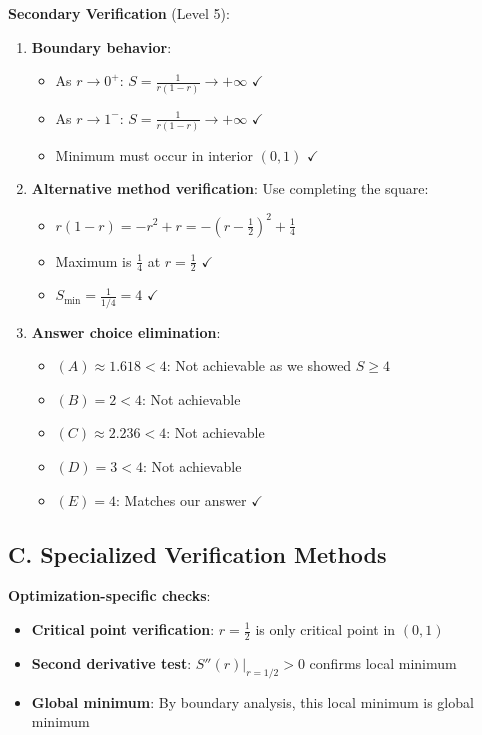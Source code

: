 \documentclass[12pt]{article}
\begin{document}
\begin{verificationbox}
\textbf{Secondary Verification} (Level 5):
\begin{enumerate}[leftmargin=*]
    \item \textbf{Boundary behavior}: 
    \begin{itemize}
        \item As $r \to 0^+$: $S = \frac{1}{r(1-r)} \to +\infty$ $\checkmark$
        \item As $r \to 1^-$: $S = \frac{1}{r(1-r)} \to +\infty$ $\checkmark$
        \item Minimum must occur in interior $(0,1)$ $\checkmark$
    \end{itemize}
    \item \textbf{Alternative method verification}: Use completing the square:
    \begin{itemize}
        \item $r(1-r) = -r^2 + r = -(r - \frac{1}{2})^2 + \frac{1}{4}$
        \item Maximum is $\frac{1}{4}$ at $r = \frac{1}{2}$ $\checkmark$
        \item $S_{\min} = \frac{1}{1/4} = 4$ $\checkmark$
    \end{itemize}
    \item \textbf{Answer choice elimination}:
    \begin{itemize}
        \item $(A) \approx 1.618 < 4$: Not achievable as we showed $S \geq 4$
        \item $(B) = 2 < 4$: Not achievable
        \item $(C) \approx 2.236 < 4$: Not achievable
        \item $(D) = 3 < 4$: Not achievable
        \item $(E) = 4$: Matches our answer $\checkmark$
    \end{itemize}
\end{enumerate}

\subsection*{C. Specialized Verification Methods}

\textbf{Optimization-specific checks}:
\begin{itemize}[leftmargin=*]
    \item \textbf{Critical point verification}: $r = \frac{1}{2}$ is only critical point in $(0,1)$
    \item \textbf{Second derivative test}: $S''(r)|_{r=1/2} > 0$ confirms local minimum
    \item \textbf{Global minimum}: By boundary analysis, this local minimum is global minimum
\end{itemize}


\end{verificationbox}
\end{document}
